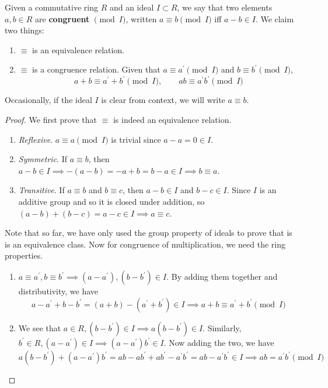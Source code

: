   \begin{theorem}
    Given a commutative ring $R$ and an ideal $I \subset R$, we say that two elements $a, b \in R$ are \textbf{congruent} $\pmod{I}$, written $a \equiv b \pmod{I}$ iff $a - b \in I$. We claim two things: 
    \begin{enumerate}
      \item $\equiv$ is an equivalence relation. 
      \item $\equiv$ is a congruence relation. Given that $a \equiv a^\prime \pmod{I}$ and $b \equiv b^\prime \pmod{I}$, 
      \begin{equation}
        a + b \equiv a^\prime + b^\prime \pmod{I}, \qquad ab \equiv a^\prime b^\prime \pmod{I}
      \end{equation}
    \end{enumerate}
    Occasionally, if the ideal $I$ is clear from context, we will write $a \equiv b$. 
  \end{theorem}
  \begin{proof}
    We first prove that $\equiv$ is indeed an equivalence relation. 
    \begin{enumerate}
      \item \textit{Reflexive}. $a \equiv a \pmod{I}$ is trivial since $a - a = 0 \in I$. 
      \item \textit{Symmetric}. If $a \equiv b$, then $a - b \in I \implies -(a - b) = -a + b = b - a \in I \implies b \equiv a$. 
      \item \textit{Transitive}. If $a \equiv b$ and $b \equiv c$, then $a - b \in I$ and $b - c \in I$. Since $I$ is an additive group and so it is closed under addition, so $(a - b) + (b - c) = a - c \in I \implies a \equiv c$. 
    \end{enumerate}
    Note that so far, we have only used the group property of ideals to prove that is is an equivalence class. Now for congruence of multiplication, we need the ring properties. 
    \begin{enumerate}
      \item $a \equiv a^\prime, b \equiv b^\prime \implies (a - a^\prime), (b - b^\prime) \in I$. By adding them together and distributivity, we have 
      \begin{equation}
        a - a^\prime + b - b^\prime = (a + b) - (a^\prime + b^\prime) \in I \implies a + b \equiv a^\prime + b^\prime \pmod{I}
      \end{equation}

      \item We see that $a \in R, (b - b^\prime) \in I \implies a(b - b^\prime) \in I$. Similarly, $b^\prime \in R, (a - a^\prime) \in I \implies (a - a^\prime) b^\prime \in I$. Now adding the two, we have 
      \begin{equation}
        a (b - b^\prime) + (a - a^\prime) b^\prime = ab - ab^\prime + ab^\prime - a^\prime b^\prime = ab - a^\prime b^\prime \in I \implies ab = a^\prime b^\prime \pmod{I}
      \end{equation}
    \end{enumerate}
  \end{proof} 

